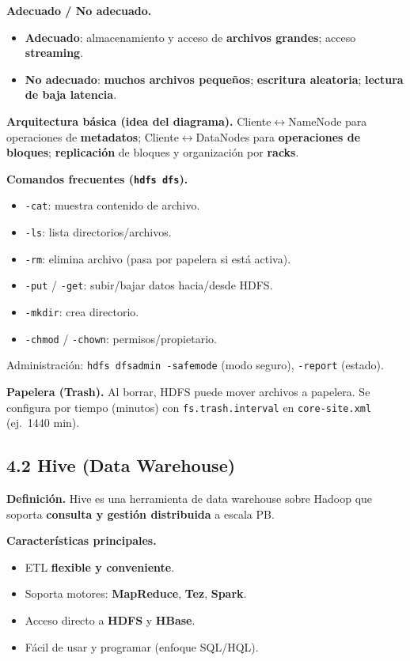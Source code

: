 \documentclass[8pt,a4paper,twocolumn]{article}
\begin{document}
\textbf{Adecuado / No adecuado.}
\begin{itemize}
\item \textbf{Adecuado}: almacenamiento y acceso de \textbf{archivos grandes}; acceso \textbf{streaming}.
\item \textbf{No adecuado}: \textbf{muchos archivos pequeños}; \textbf{escritura aleatoria}; \textbf{lectura de baja latencia}.
\end{itemize}

\textbf{Arquitectura básica (idea del diagrama).} Cliente$\leftrightarrow$NameNode para operaciones de \textbf{metadatos}; Cliente$\leftrightarrow$DataNodes para \textbf{operaciones de bloques}; \textbf{replicación} de bloques y organización por \textbf{racks}.

\textbf{Comandos frecuentes (\texttt{hdfs dfs}).}
\begin{itemize}
\item \texttt{-cat}: muestra contenido de archivo.
\item \texttt{-ls}: lista directorios/archivos.
\item \texttt{-rm}: elimina archivo (pasa por papelera si está activa).
\item \texttt{-put} / \texttt{-get}: subir/bajar datos hacia/desde HDFS.
\item \texttt{-mkdir}: crea directorio.
\item \texttt{-chmod} / \texttt{-chown}: permisos/propietario.
\end{itemize}
Administración: \texttt{hdfs dfsadmin -safemode} (modo seguro), \texttt{-report} (estado).

\textbf{Papelera (Trash).} Al borrar, HDFS puede mover archivos a papelera. Se configura por tiempo (minutos) con \texttt{fs.trash.interval} en \texttt{core-site.xml} (ej.\ 1440 min).

\subsection{4.2 Hive (Data Warehouse)}
\textbf{Definición.} Hive es una herramienta de data warehouse sobre Hadoop que soporta \textbf{consulta y gestión distribuida} a escala PB.

\textbf{Características principales.}
\begin{itemize}
\item ETL \textbf{flexible y conveniente}.
\item Soporta motores: \textbf{MapReduce}, \textbf{Tez}, \textbf{Spark}.
\item Acceso directo a \textbf{HDFS} y \textbf{HBase}.
\item Fácil de usar y programar (enfoque SQL/HQL).
\end{itemize}
\end{document}
